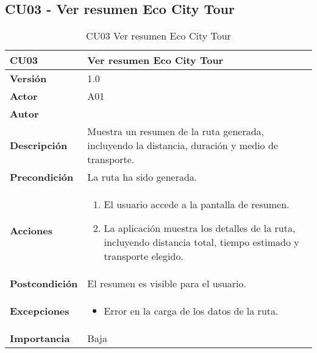 \subsection{CU03 - Ver resumen Eco City Tour}
\begin{table}[p]
	\centering
	\begin{tabularx}{\linewidth}{ p{} p{} }
		\toprule
		\textbf{CU03}    & \textbf{Ver resumen Eco City Tour} \\
		\toprule
		\textbf{Versión}              & 1.0    \\
		\textbf{Actor}                & A01 \\
		\textbf{Autor}                & \autor \\
		\textbf{Descripción}          & Muestra un resumen de la ruta generada, incluyendo la distancia, duración y medio de transporte. \\
		\textbf{Precondición}         & La ruta ha sido generada. \\
		\textbf{Acciones}             &
		\begin{enumerate}
			\def\labelenumi{\arabic{enumi}.}
			\tightlist
			\item El usuario accede a la pantalla de resumen.
			\item La aplicación muestra los detalles de la ruta, incluyendo distancia total, tiempo estimado y transporte elegido.
		\end{enumerate}\\
		\textbf{Postcondición}        & El resumen es visible para el usuario. \\
		\textbf{Excepciones}          & 
		\begin{itemize}
			\tightlist
			\item Error en la carga de los datos de la ruta.
		\end{itemize}\\
		\textbf{Importancia}          & Baja \\
		\bottomrule
	\end{tabularx}
	\caption{CU03 Ver resumen Eco City Tour}
\end{table}

